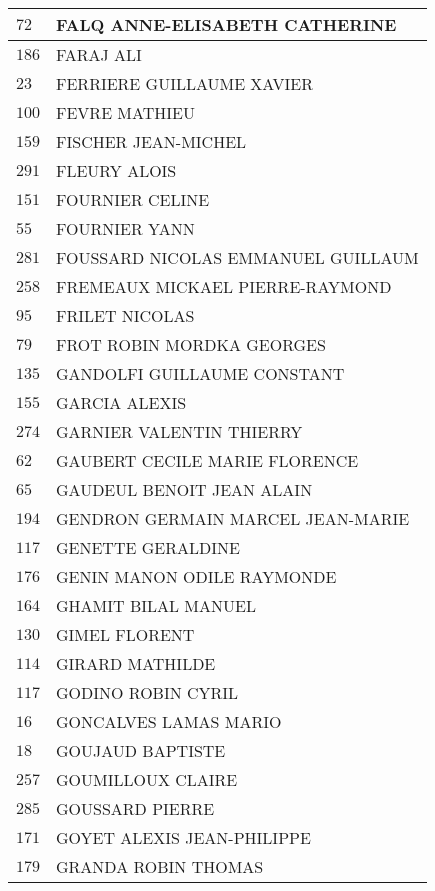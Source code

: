 \begin{xltabular}{\linewidth}{|l|X|}
    $72$ & FALQ ANNE-ELISABETH CATHERINE \\
    \hline
    $186$ & FARAJ ALI \\
    \hline
    $23$ & FERRIERE GUILLAUME XAVIER \\
    \hline
    $100$ & FEVRE MATHIEU \\
    \hline
    $159$ & FISCHER JEAN-MICHEL \\
    \hline
    $291$ & FLEURY ALOIS \\
    \hline
    $151$ & FOURNIER CELINE \\
    \hline
    $55$ & FOURNIER YANN \\
    \hline
    $281$ & FOUSSARD NICOLAS EMMANUEL GUILLAUM \\
    \hline
    $258$ & FREMEAUX MICKAEL PIERRE-RAYMOND \\
    \hline
    $95$ & FRILET NICOLAS \\
    \hline
    $79$ & FROT ROBIN MORDKA GEORGES \\
    \hline
    $135$ & GANDOLFI GUILLAUME CONSTANT \\
    \hline
    $155$ & GARCIA ALEXIS \\
    \hline
    $274$ & GARNIER VALENTIN THIERRY \\
    \hline
    $62$ & GAUBERT CECILE MARIE FLORENCE \\
    \hline
    $65$ & GAUDEUL BENOIT JEAN ALAIN \\
    \hline
    $194$ & GENDRON GERMAIN MARCEL JEAN-MARIE \\
    \hline
    $117$ & GENETTE GERALDINE \\
    \hline
    $176$ & GENIN MANON ODILE RAYMONDE \\
    \hline
    $164$ & GHAMIT BILAL MANUEL \\
    \hline
    $130$ & GIMEL FLORENT \\
    \hline
    $114$ & GIRARD MATHILDE \\
    \hline
    $117$ & GODINO ROBIN CYRIL \\
    \hline
    $16$ & GONCALVES LAMAS MARIO \\
    \hline
    $18$ & GOUJAUD BAPTISTE \\
    \hline
    $257$ & GOUMILLOUX CLAIRE \\
    \hline
    $285$ & GOUSSARD PIERRE \\
    \hline
    $171$ & GOYET ALEXIS JEAN-PHILIPPE \\
    \hline
    $179$ & GRANDA ROBIN THOMAS \\

\end{xltabular}
